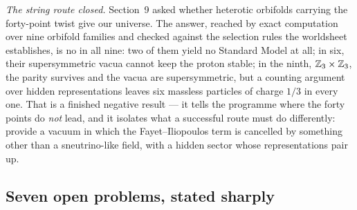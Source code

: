 \emph{The string route closed.} Section~9 asked whether heterotic orbifolds carrying the forty-point twist
give our universe. The answer, reached by exact computation over nine orbifold families and checked
against the selection rules the worldsheet establishes, is no in all nine: two of them yield no Standard Model at all; in six, their supersymmetric vacua
cannot keep the proton stable; in the ninth, $\mathbb{Z}_3\times\mathbb{Z}_3$, the parity survives and the vacua are
supersymmetric, but a counting argument over hidden representations leaves six massless particles of charge
$1/3$ in every one. That is a finished negative result --- it tells the programme where the forty points do
\emph{not} lead, and it isolates what a successful route must do differently: provide a vacuum in which the
Fayet--Iliopoulos term is cancelled by something other than a sneutrino-like field, with a hidden sector whose
representations pair up.

\subsection{Seven open problems, stated sharply}

